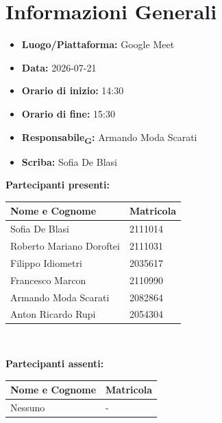 \section{Informazioni Generali}
\begin{itemize}
	\item \textbf{Luogo/Piattaforma:} Google Meet
	\item \textbf{Data:} 2026-07-21
	\item \textbf{Orario di inizio:} 14:30
	\item \textbf{Orario di fine:} 15:30
	\item \textbf{Responsabile\textsubscript{G}:} Armando Moda Scarati
	\item \textbf{Scriba:} Sofia De Blasi
\end{itemize}

\vspace{0.5cm}
\textbf{Partecipanti presenti:}
\begin{table}[ht]
	\centering
	\renewcommand{\arraystretch}{1.2}
	\begin{tabularx}{\textwidth}{X l}
		\toprule
		\textbf{Nome e Cognome} & \textbf{Matricola} \\
		\midrule
		Sofia De Blasi & 2111014 \\
		Roberto Mariano Doroftei & 2111031 \\
		Filippo Idiometri & 2035617 \\
		Francesco Marcon & 2110990 \\
		Armando Moda Scarati & 2082864 \\
		Anton Ricardo Rupi & 2054304 \\
		\bottomrule
	\end{tabularx}
\\ \end{table}

\vspace{0.5cm}
\textbf{Partecipanti assenti:}
\begin{table}[ht]
	\centering
	\renewcommand{\arraystretch}{1.2}
	\begin{tabularx}{\textwidth}{X l}
		\toprule
		\textbf{Nome e Cognome} & \textbf{Matricola} \\
		\midrule
		Nessuno & - \\
		\bottomrule
	\end{tabularx}
\end{table}

